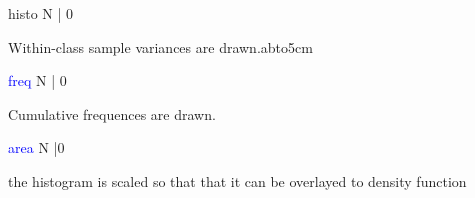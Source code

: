 \vspace{0.3cm}
\hline
\vspace{0.3cm}
\noindent histo  \tabto{3cm}   N | 0  \tabto{5cm}     \tabto{7cm}
\begin{changemargin}{3cm}{0cm}
\noindent Within-class sample variances are drawn.abto{5cm}
\end{changemargin}
\vspace{0.3cm}
\hline
\vspace{0.3cm}
\noindent \textcolor{blue}{freq}  \tabto{3cm}  N | 0  \tabto{5cm}     \tabto{7cm}
\begin{changemargin}{3cm}{0cm}
\noindent Cumulative  frequences are drawn.
\end{changemargin}
\vspace{0.3cm}
\hline
\vspace{0.3cm}
\noindent \textcolor{blue}{area}  \tabto{3cm}  N |0  \tabto{5cm}    \tabto{7cm}
\begin{changemargin}{3cm}{0cm}
\noindent the histogram is scaled so that that it can be overlayed to density function
\end {changemargin}
\hline
\vspace{0.2cm}
